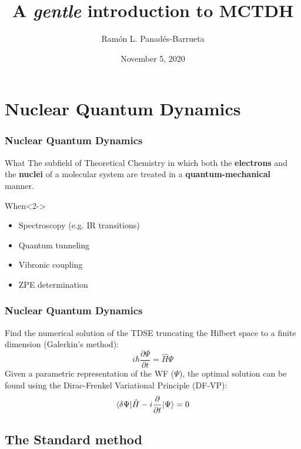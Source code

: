 \documentclass{beamer}
\title[Intro MCTDH]{A \emph{gentle} introduction to MCTDH}
\author[Panadés-Barrueta]{Ramón L. Panadés-Barrueta}
\institute{Computational Chemical Physics Group. \\ University of Twente.}
\date{\small November 5, 2020}
\begin{document}
\frame{\titlepage}

\begin{frame}
  \tableofcontents
\end{frame}

\section{Nuclear Quantum Dynamics}\label{nqd}

\begin{frame}
  \frametitle{Nuclear Quantum Dynamics}
  \begin{block}{What}
   \justifying{}
   The subfield of Theoretical Chemistry in which both the \textbf{electrons} and the \textbf{nuclei} of
   a molecular system are treated in a \textbf{quantum-mechanical} manner. 
  \end{block}
  \begin{exampleblock}{When}<2->
    \begin{itemize}
    \item Spectroscopy (e.g. IR transitions)
    \item Quantum tunneling
    \item Vibronic coupling
    \item ZPE determination
    \end{itemize}
  \end{exampleblock}
\end{frame}

\begin{frame}
  \frametitle{Nuclear Quantum Dynamics}
  Find the numerical solution of the TDSE truncating the Hilbert space to a finite dimension (Galerkin's method):
\begin{equation}
  i\hbar\frac{\partial\Psi}{\partial t} = \hat{H}\Psi
\end{equation}
Given a parametric representation of the WF (\(\Psi\)), the optimal solution can be found using the Dirac-Frenkel Variational Principle (DF-VP):
\begin{equation}
	\braket{\delta\Psi|\hat{H}-i\frac{\partial }{\partial t}|\Psi} = 0
\end{equation}
\end{frame}

\subsection{The Standard method}\label{stdmeth}
\end{document}
